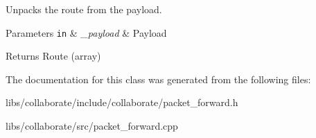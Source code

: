 Unpacks the route from the payload. 


\begin{DoxyParams}[1]{Parameters}
\mbox{\tt in}  & {\em \+\_\+payload} & Payload \\
\hline
\end{DoxyParams}
\begin{DoxyReturn}{Returns}
Route (array) 
\end{DoxyReturn}


The documentation for this class was generated from the following files\+:\begin{DoxyCompactItemize}
\item 
libs/collaborate/include/collaborate/packet\+\_\+forward.\+h\item 
libs/collaborate/src/packet\+\_\+forward.\+cpp\end{DoxyCompactItemize}
